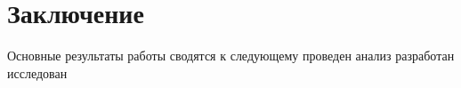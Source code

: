 \chapter{Заключение}
Основные результаты работы сводятся к следующему
 проведен анализ
 разработан
 исследован